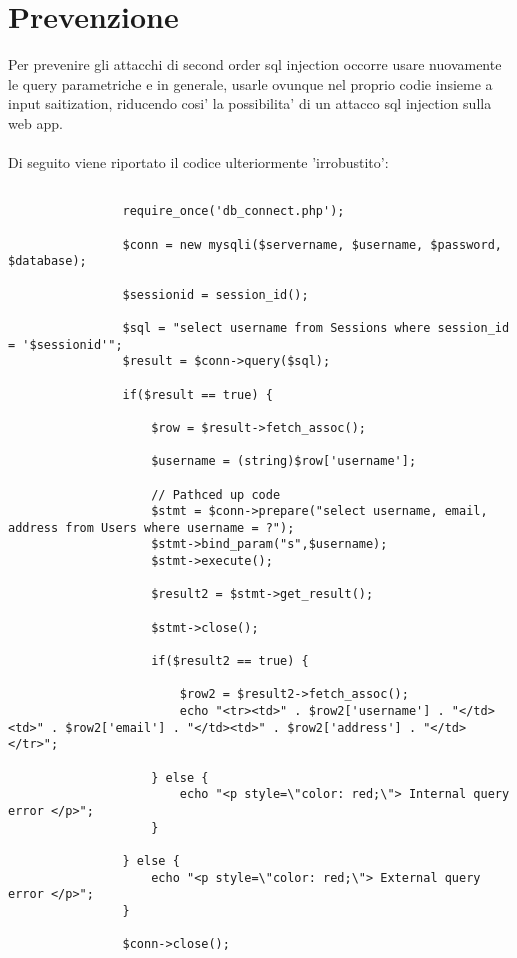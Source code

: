 \documentclass{book}
\begin{document}
\section{Prevenzione}
Per prevenire gli attacchi di second order sql injection occorre usare nuovamente le query parametriche e in generale,
usarle ovunque nel proprio codie insieme a input saitization, riducendo cosi' la possibilita' di un attacco sql injection
sulla web app.
\\
\\
Di seguito viene riportato il codice ulteriormente 'irrobustito':
\\
\begin{lstlisting}
    
                require_once('db_connect.php');

                $conn = new mysqli($servername, $username, $password, $database);

                $sessionid = session_id();

                $sql = "select username from Sessions where session_id = '$sessionid'";
                $result = $conn->query($sql);

                if($result == true) {

                    $row = $result->fetch_assoc();

                    $username = (string)$row['username'];

                    // Pathced up code
                    $stmt = $conn->prepare("select username, email, address from Users where username = ?");
                    $stmt->bind_param("s",$username);
                    $stmt->execute();
                    
                    $result2 = $stmt->get_result();

                    $stmt->close();
                    
                    if($result2 == true) {

                        $row2 = $result2->fetch_assoc();
                        echo "<tr><td>" . $row2['username'] . "</td><td>" . $row2['email'] . "</td><td>" . $row2['address'] . "</td></tr>"; 

                    } else {
                        echo "<p style=\"color: red;\"> Internal query error </p>";
                    }

                } else {
                    echo "<p style=\"color: red;\"> External query error </p>";
                }

                $conn->close();

\end{lstlisting}
\end{document}
